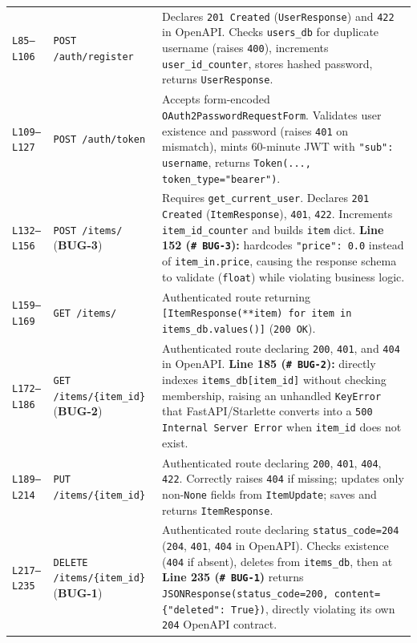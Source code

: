 \documentclass[11pt,a4paper]{article}
\begin{document}
\begin{longtable}{L{1.4cm} L{5.2cm} L{9.0cm}}
\texttt{L85--L106} & \texttt{POST /auth/register} & Declares \texttt{201 Created} (\texttt{UserResponse}) and \texttt{422} in OpenAPI. Checks \texttt{users\_db} for duplicate username (raises \texttt{400}), increments \texttt{user\_id\_counter}, stores hashed password, returns \texttt{UserResponse}. \\
\texttt{L109--L127} & \texttt{POST /auth/token} & Accepts form-encoded \texttt{OAuth2PasswordRequestForm}. Validates user existence and password (raises \texttt{401} on mismatch), mints 60-minute JWT with \texttt{"sub": username}, returns \texttt{Token(..., token\_type="bearer")}. \\
\texttt{L132--L156} & \texttt{POST /items/} (\textbf{BUG-3}) & Requires \texttt{get\_current\_user}. Declares \texttt{201 Created} (\texttt{ItemResponse}), \texttt{401}, \texttt{422}. Increments \texttt{item\_id\_counter} and builds \texttt{item} dict. \textbf{Line 152 (\texttt{\# BUG-3}):} hardcodes \texttt{"price": 0.0} instead of \texttt{item\_in.price}, causing the response schema to validate (\texttt{float}) while violating business logic. \\
\texttt{L159--L169} & \texttt{GET /items/} & Authenticated route returning \texttt{[ItemResponse(**item) for item in items\_db.values()]} (\texttt{200 OK}). \\
\texttt{L172--L186} & \texttt{GET /items/\{item\_id\}} (\textbf{BUG-2}) & Authenticated route declaring \texttt{200}, \texttt{401}, and \texttt{404} in OpenAPI. \textbf{Line 185 (\texttt{\# BUG-2}):} directly indexes \texttt{items\_db[item\_id]} without checking membership, raising an unhandled \texttt{KeyError} that FastAPI/Starlette converts into a \texttt{500 Internal Server Error} when \texttt{item\_id} does not exist. \\
\texttt{L189--L214} & \texttt{PUT /items/\{item\_id\}} & Authenticated route declaring \texttt{200}, \texttt{401}, \texttt{404}, \texttt{422}. Correctly raises \texttt{404} if missing; updates only non-\texttt{None} fields from \texttt{ItemUpdate}; saves and returns \texttt{ItemResponse}. \\
\texttt{L217--L235} & \texttt{DELETE /items/\{item\_id\}} (\textbf{BUG-1}) & Authenticated route declaring \texttt{status\_code=204} (\texttt{204}, \texttt{401}, \texttt{404} in OpenAPI). Checks existence (\texttt{404} if absent), deletes from \texttt{items\_db}, then at \textbf{Line 235 (\texttt{\# BUG-1})} returns \texttt{JSONResponse(status\_code=200, content=\{"deleted": True\})}, directly violating its own \texttt{204} OpenAPI contract. \\
\bottomrule
\end{longtable}
\end{document}
